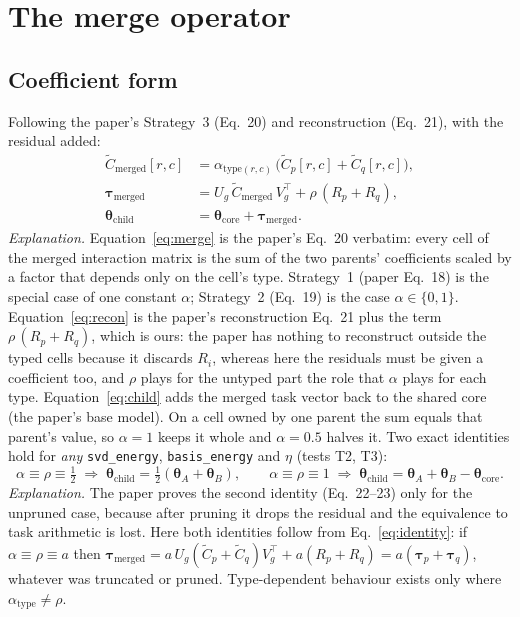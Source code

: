 \documentclass[11pt,a4paper]{article}
\newcommand{\tauv}{\boldsymbol{\tau}}
\newcommand{\thetav}{\boldsymbol{\theta}}
\newcommand{\Ug}{U_g}
\newcommand{\Vg}{V_g}
\newcommand{\Ct}{\tilde{C}}
\newcommand{\code}[1]{\texttt{#1}}
\begin{document}
\section{The merge operator}
\label{sec:operator}

\subsection{Coefficient form}
Following the paper's Strategy~3 (Eq.~20) and reconstruction (Eq.~21), with the residual added:
\begin{align}
\Ct_{\mathrm{merged}}[r,c] &= \alpha_{\mathrm{type}(r,c)}\,\bigl(\Ct_p[r,c] + \Ct_q[r,c]\bigr), \label{eq:merge}\\
\tauv_{\mathrm{merged}} &= \Ug\,\Ct_{\mathrm{merged}}\,\Vg^{\top} + \rho\,(R_p + R_q), \label{eq:recon}\\
\thetav_{\mathrm{child}} &= \thetav_{\mathrm{core}} + \tauv_{\mathrm{merged}}. \label{eq:child}
\end{align}
\emph{Explanation.} Equation~\ref{eq:merge} is the paper's Eq.~20 verbatim: every cell of the merged interaction matrix is the sum of the two parents' coefficients scaled by a factor that depends only on the cell's type. Strategy~1 (paper Eq.~18) is the special case of one constant $\alpha$; Strategy~2 (Eq.~19) is the case $\alpha\in\{0,1\}$. Equation~\ref{eq:recon} is the paper's reconstruction Eq.~21 plus the term $\rho\,(R_p+R_q)$, which is ours: the paper has nothing to reconstruct outside the typed cells because it discards $R_i$, whereas here the residuals must be given a coefficient too, and $\rho$ plays for the untyped part the role that $\alpha$ plays for each type. Equation~\ref{eq:child} adds the merged task vector back to the shared core (the paper's base model). On a cell owned by one parent the sum equals that parent's value, so $\alpha=1$ keeps it whole and $\alpha=0.5$ halves it. Two exact identities hold for \emph{any} \code{svd\_energy}, \code{basis\_energy} and $\eta$ (tests T2, T3):
\begin{equation}
\alpha\equiv\rho\equiv\tfrac12 \;\Rightarrow\; \thetav_{\mathrm{child}} = \tfrac12(\thetav_A+\thetav_B),
\qquad
\alpha\equiv\rho\equiv 1 \;\Rightarrow\; \thetav_{\mathrm{child}} = \thetav_A+\thetav_B-\thetav_{\mathrm{core}} .
\end{equation}
\emph{Explanation.} The paper proves the second identity (Eq.~22--23) only for the unpruned case, because after pruning it drops the residual and the equivalence to task arithmetic is lost. Here both identities follow from Eq.~\ref{eq:identity}: if $\alpha\equiv\rho\equiv a$ then $\tauv_{\mathrm{merged}}=a\,\Ug(\Ct_p+\Ct_q)\Vg^{\top}+a(R_p+R_q)=a(\tauv_p+\tauv_q)$, whatever was truncated or pruned. Type-dependent behaviour exists only where $\alpha_{\mathrm{type}}\neq\rho$.
\end{document}
